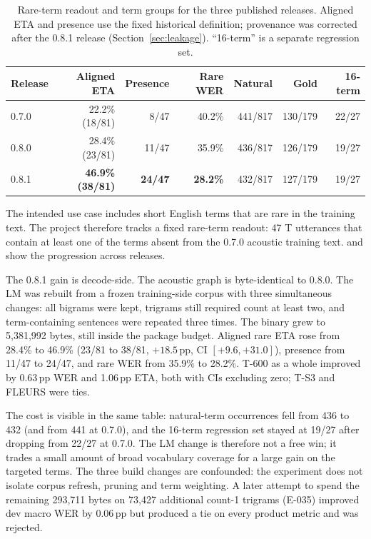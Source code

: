 \documentclass{article}
\begin{document}
\begin{table}[t]
\centering
\small
\setlength{\tabcolsep}{4pt}
\caption{Rare-term readout and term groups for the three published releases. Aligned ETA and
presence use the fixed historical definition; provenance was corrected after the 0.8.1 release
(Section~\ref{sec:leakage}). ``16-term'' is a separate regression set.}
\label{tab:rare}
\begin{tabular}{@{}lrrrrrr@{}}
\toprule
Release & Aligned ETA & Presence & Rare WER & Natural & Gold & 16-term \\
\midrule
0.7.0 & 22.2\% (18/81) & 8/47 & 40.2\% & 441/817 & 130/179 & 22/27 \\
0.8.0 & 28.4\% (23/81) & 11/47 & 35.9\% & 436/817 & 126/179 & 19/27 \\
0.8.1 & \textbf{46.9\% (38/81)} & \textbf{24/47} & \textbf{28.2\%} & 432/817 & 127/179 & 19/27 \\
\bottomrule
\end{tabular}
\end{table}

The intended use case includes short English terms that are rare in the training text. The project
therefore tracks a fixed rare-term readout: 47 T utterances that contain at least one of the
terms absent from the 0.7.0 acoustic training text.  and  show the
progression across releases.

The 0.8.1 gain is decode-side. The acoustic graph is byte-identical to 0.8.0. The LM was rebuilt
from a frozen training-side corpus with three simultaneous changes: all bigrams were kept,
trigrams still required count at least two, and term-containing sentences were repeated three
times. The binary grew to 5{,}381{,}992 bytes, still inside the package budget. Aligned rare ETA
rose from 28.4\% to 46.9\% (23/81 to 38/81, $+18.5$\,pp, CI $[+9.6,+31.0]$), presence from 11/47
to 24/47, and rare WER from 35.9\% to 28.2\%. T-600 as a whole improved by 0.63\,pp WER and 1.06\,pp
ETA, both with CIs excluding zero; T-S3 and FLEURS were ties.

The cost is visible in the same table: natural-term occurrences fell from 436 to 432 (and from
441 at 0.7.0), and the 16-term regression set stayed at 19/27 after dropping from 22/27 at 0.7.0.
The LM change is therefore not a free win; it trades a small amount of broad vocabulary coverage
for a large gain on the targeted terms. The three build changes are confounded: the experiment
does not isolate corpus refresh, pruning and term weighting. A later attempt to spend the
remaining 293{,}711 bytes on 73{,}427 additional count-1 trigrams (E-035) improved dev macro WER
by 0.06\,pp but produced a tie on every product metric and was rejected.
\end{document}
